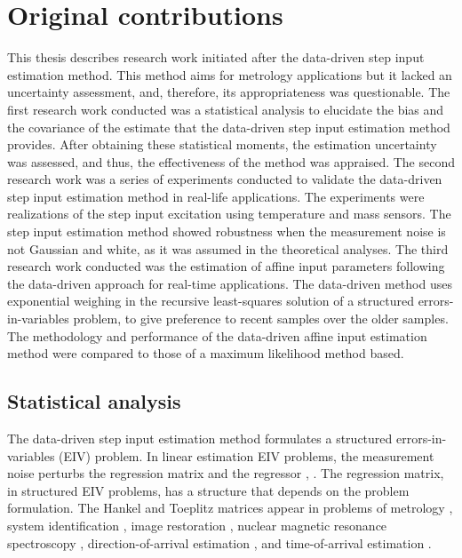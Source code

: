\section{Original contributions}


This thesis describes research work initiated after the data-driven step input estimation method.
This method aims for metrology applications but it lacked an uncertainty assessment, and, therefore, its appropriateness was questionable.
The first research work conducted was a statistical analysis to elucidate the bias and the covariance of the estimate that the data-driven step input estimation method provides.
After obtaining these statistical moments, the estimation uncertainty was assessed, and thus, the effectiveness of the method was appraised.
The second research work was a series of experiments conducted to validate the data-driven step input estimation method in real-life applications.
The experiments were realizations of the step input excitation using temperature and mass sensors.
The step input estimation method showed robustness when the measurement noise is not Gaussian and white, as it was assumed in the theoretical analyses.
The third research work conducted was the estimation of affine input parameters following the data-driven approach for real-time applications. 
The data-driven method uses exponential weighing in the recursive least-squares solution of a structured errors-in-variables problem, to give preference to recent samples over the older samples.
The methodology and performance of the data-driven affine input estimation method were compared to those of a maximum likelihood method based.

\subsection{Statistical analysis}

The data-driven step input estimation method formulates a structured errors-in-variables (EIV) problem.
In linear estimation EIV problems, the measurement noise perturbs the regression matrix and the regressor \citep{VanHuffel91Book}, \citep{Markovsky07overview}.
The regression matrix, in structured EIV problems, has a structure that depends on the problem formulation.
The Hankel and Toeplitz matrices appear in problems of metrology \citep{Markovsky15cep}, system identification \citep{Soderstrom07}, image restoration \citep{Feiz17}, nuclear magnetic resonance spectroscopy \citep{Cai16}, direction-of-arrival estimation \citep{Pan18}, and time-of-arrival estimation \citep{Jia18}.

